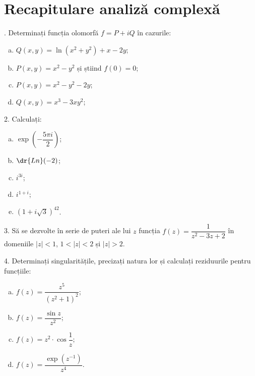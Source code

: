 
\chapter{Recapitulare analiză complexă}

\indent{}. Determinați funcția olomorfă $ f = P + iQ $ în cazurile:
\begin{enumerate}[(a)]
    \item $ Q(x, y) = \ln(x^2 + y^2) + x - 2y $;
    \item $ P(x, y) = x^2 - y^2 $ și știind $ f(0) = 0 $;
    \item $ P(x, y) = x^2 - y^2 - 2y $;
    \item $ Q(x, y) = x^3 - 3xy^2 $;
\end{enumerate}

\vspace{0.3cm}

2. Calculați:
\begin{enumerate}[(a)]
    \item $ \exp\left( -\dfrac{5 \pi i}{2} \right) $;
    \item $ \dr{Ln}(-2) $;
    \item $ i^{3i} $;
    \item $ i^{1 + i} $;
    \item $ (1 + i \sqrt{3})^{42} $.
\end{enumerate}

\vspace{0.3cm}

3. Să se dezvolte în serie de puteri ale lui $ z $ funcția $ f(z) = \dfrac{1}{z^2 - 3z + 2} $
în domeniile $ |z| < 1 $, $ 1 < |z| < 2 $ și $ |z| > 2 $.

\vspace{0.3cm}

4. Determinați singularitățile, precizați natura lor și calculați reziduurile pentru funcțiile:
\begin{enumerate}[(a)]
    \item $ f(z) = \dfrac{z^5}{(z^2 + 1)^2} $;
    \item $ f(z) = \dfrac{\sin z}{z^2} $;
    \item $ f(z) = z^2 \cdot \cos \dfrac{1}{z} $;
    \item $ f(z) = \dfrac{\exp(z^{-1})}{z^4} $.
\end{enumerate}

\vspace{0.3cm}

